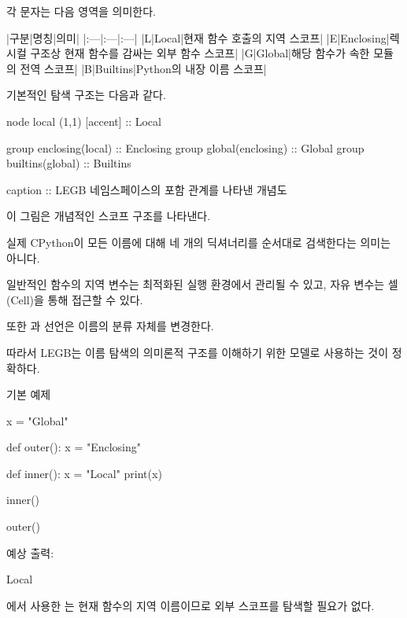 각 문자는 다음 영역을 의미한다.

\begin{dhktable}
|구분|명칭|의미|
|:---|:---|:---|
|L|Local|현재 함수 호출의 지역 스코프|
|E|Enclosing|렉시컬 구조상 현재 함수를 감싸는 외부 함수 스코프|
|G|Global|해당 함수가 속한 모듈의 전역 스코프|
|B|Builtins|Python의 내장 이름 스코프|
\end{dhktable}

기본적인 탐색 구조는 다음과 같다.

\begin{dhkgraph}[uniform]
node local (1,1) [accent] :: Local

group enclosing(local) :: Enclosing
group global(enclosing) :: Global
group builtins(global) :: Builtins

caption :: LEGB 네임스페이스의 포함 관계를 나타낸 개념도
\end{dhkgraph}

이 그림은 개념적인 스코프 구조를 나타낸다.

실제 CPython이 모든 이름에 대해 네 개의 딕셔너리를 순서대로 검색한다는 의미는 아니다.

일반적인 함수의 지역 변수는 최적화된 실행 환경에서 관리될 수 있고, 자유 변수는 셀(Cell)을 통해 접근할 수 있다.

또한 과  선언은 이름의 분류 자체를 변경한다.

따라서 LEGB는 이름 탐색의 의미론적 구조를 이해하기 위한 모델로 사용하는 것이 정확하다.

\begin{dhknote}
\begin{dhksmry}[centered]
기본 예제
\end{dhksmry}
\end{dhknote}

\begin{dhkcode}
x = "Global"

def outer():
    x = "Enclosing"

    def inner():
        x = "Local"
        print(x)

    inner()

outer()
\end{dhkcode}

예상 출력:

\begin{dhkzsh}
Local
\end{dhkzsh}

에서 사용한 는 현재 함수의 지역 이름이므로 외부 스코프를 탐색할 필요가 없다.

